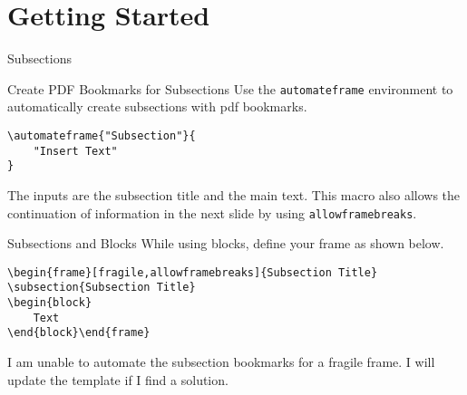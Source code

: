 \section{Getting Started}

\begin{frame}{Subsections}
    \begin{block}{Create PDF Bookmarks for Subsections}
    Use the \texttt{automateframe} environment to automatically create subsections with pdf bookmarks.
\begin{verbatim}
\automateframe{"Subsection"}{
    "Insert Text"
}
\end{verbatim}
        The inputs are the subsection title and the main text. This macro also allows the continuation of information in the next slide by using \texttt{allowframebreaks}.
    \end{block}

    \begin{block}{Subsections and Blocks}
        While using blocks, define your frame as shown below.
\begin{verbatim}
\begin{frame}[fragile,allowframebreaks]{Subsection Title}
\subsection{Subsection Title}
\begin{block}
    Text
\end{block}\end{frame}
\end{verbatim}
I am unable to automate the subsection bookmarks for a fragile frame. I will update the template if I find a solution.
    \end{block}
\end{frame}

